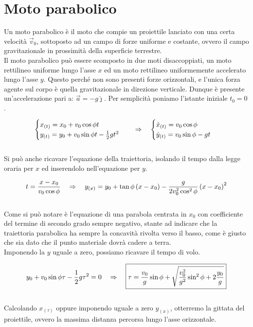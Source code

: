 \section{Moto parabolico}
Un moto parabolico è il moto che compie un proiettile lanciato con una
certa velocità $\vec v_0$, sottoposto ad un campo di forze uniforme e
costante, ovvero il campo gravitazionale in prossimità della superficie
terrestre.\\
Il moto parabolico può essere scomposto in due moti disaccoppiati,
un moto rettilineo uniforme lungo l'asse $x$ ed un moto rettilineo
uniformemente accelerato lungo l'asse $y$. Questo perché non sono presenti
forze orizzontali, e l'unica forza agente sul corpo è quella gravitazionale
in direzione verticale. Dunque è presente un'accelerazione pari a:
$\vec a = -g\hat\jmath $. Per semplicità poniamo l'istante iniziale $ t_0 = 0$.

\begin{equation}
    \begin{cases}
        x_{(t)} = x_0 + v_0\cos\phi t\\
        y_{(t)} = y_0 + v_0\sin\phi t - \frac12 g t^2
    \end{cases}\quad\Rightarrow\quad
    \begin{cases}
        \dot x_{(t)} = v_0\cos\phi \\
        \dot y_{(t)} = v_0\sin\phi - gt
    \end{cases}
\label{eq:MP}
\end{equation}
\\
Si può anche ricavare l'equazione della traiettoria, isolando il tempo
dalla legge oraria per $x$ ed inserendolo nell'equazione per $y$.

\begin{equation}
    t = \frac{x-x_0}{v_0\cos\phi}\quad\Rightarrow\quad y_{(x)} =
    y_0 + \tan\phi\left( x-x_0\right)-\frac{g}{2v_0^2\cos^2\phi}\left( x-x_0\right)^2
\label{eq:MP_y(x)}
\end{equation}
\\
Come si può notare è l'equazione di una parabola centrata in $x_0$ con
coefficiente del termine di secondo grado sempre negativo, stante ad
indicare che la traiettoria parabolica ha sempre la concavità rivolta
verso il basso, come è giusto che sia dato che il punto materiale dovrà
cadere a terra.
\\ Imponendo la $y$ uguale a zero, possiamo ricavare il tempo di volo.

\begin{equation}
    y_0 + v_0\sin\phi \tau - \frac12 g \tau^2 = 0 \quad\Rightarrow\quad
    \boxed{\tau = \frac{v_0}{g}\sin\phi + \sqrt{\frac{v_0^2}{g^2}\sin^2\phi+2\frac{y_0}g}}
\label{eq:flytime}
\end{equation}
\\
Calcolando $x_{(\tau)}$ oppure imponendo uguale a zero $y_{(x)}$, otterremo
la gittata del proiettile, ovvero la massima distanza percorsa lungo
l'asse orizzontale.

